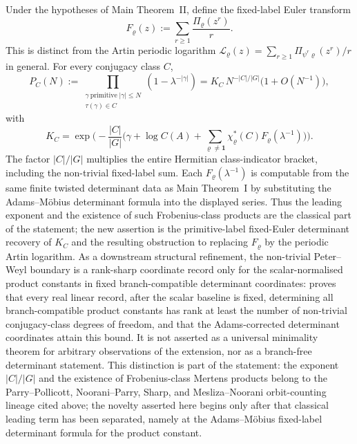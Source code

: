 \begin{theorem}
  \label{stmt:main-theorem-iii-adams-frobenius-products}
  \label{thm:intro-adams-frobenius-products}
  Under the hypotheses of Main Theorem~II, define the fixed-label Euler
  transform
  \[
    F_\varrho(z):=\sum_{r\ge1}\frac{\Pi_\varrho(z^r)}{r}.
  \]
  This is distinct from the Artin periodic logarithm
  \(\mathcal L_\varrho(z)=\sum_{r\ge1}\Pi_{\psi^r\varrho}(z^r)/r\) in
  general.  For every conjugacy class \(C\),
  \[
    P_C(N):=
    \prod_{\substack{\gamma\ \mathrm{primitive}\; |\gamma|\le N\\
      \tau(\gamma)\in C}}
      (1-\lambda^{-|\gamma|})
    =K_C\,N^{-|C|/|G|}\bigl(1+O(N^{-1})\bigr),
  \]
  with
  \[
    K_C=\exp\biggl(-\frac{|C|}{|G|}
      \biggl(\gamma+\log C(A)+
        \sum_{\varrho\neq\mathbf1}\chi_\varrho^\ast(C)
          F_\varrho(\lambda^{-1})\biggr)\biggr).
  \]
  The factor \(|C|/|G|\) multiplies the entire Hermitian class-indicator
  bracket, including the non-trivial fixed-label sum.  Each
  \(F_\varrho(\lambda^{-1})\) is computable from the same finite
  twisted determinant data as Main Theorem~I by substituting the
  Adams--M\"obius determinant formula into the displayed series.  Thus
  the leading exponent and the existence of such Frobenius-class products
  are the classical part of the statement; the new assertion is the
  primitive-label fixed-Euler determinant recovery of \(K_C\) and the
  resulting obstruction to replacing \(F_\varrho\) by the periodic Artin
  logarithm.  As a downstream structural refinement, the non-trivial
  Peter--Weyl boundary is a rank-sharp coordinate record only for the
  scalar-normalised product constants in fixed branch-compatible determinant
  coordinates:
   proves that every
  real linear record, after the scalar baseline is fixed, determining all
  branch-compatible product constants has rank
  at least the number of non-trivial conjugacy-class degrees of freedom,
  and that the Adams-corrected determinant coordinates attain this bound.
  It is not asserted as a universal minimality theorem for arbitrary
  observations of the extension, nor as a branch-free determinant statement.
  This distinction is part of the statement: the exponent
  \(|C|/|G|\) and the existence of Frobenius-class Mertens products belong
  to the Parry--Pollicott, Noorani--Parry, Sharp, and Mesliza--Noorani
  orbit-counting lineage cited above; the novelty asserted here begins
  only after that classical leading term has been separated, namely at the
  Adams--M\"obius fixed-label determinant formula for the product
  constant.
\end{theorem}
